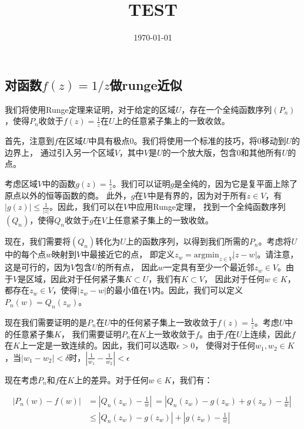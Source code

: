 \documentclass[12pt, a4paper, oneside]{article}
\title{TEST}
\date{\today}
\author{}
\begin{document}
\begin{spacing}{2.0}
\maketitle


\section{对函数$f(z) = 1/z$做runge近似}

我们将使用Runge定理来证明，对于给定的区域$U$，存在一个全纯函数序列$(P_n)$，使得$P_n$收敛于$f(z) = \frac{1}{z}$在$U$上的任意紧子集上的一致收敛。

首先，注意到$f$在区域$U$中具有极点$0$。我们将使用一个标准的技巧，将$0$移动到$U$的边界上，
通过引入另一个区域$V$，其中$V$是$U$的一个放大版，包含$0$和其他所有$U$的点。

考虑区域$V$中的函数$g(z) = \frac{1}{z}$。我们可以证明$g$是全纯的，因为它是复平面上除了原点以外的恒等函数的商。
此外，$g$在$V$中是有界的，因为对于所有$z \in V$，有$|g(z)| \leq \frac{1}{|z|}$。因此，我们可以在$V$中应用Runge定理，
找到一个全纯函数序列$(Q_n)$，使得$Q_n$收敛于$g$在$V$上任意紧子集上的一致收敛。

现在，我们需要将$(Q_n)$转化为$U$上的函数序列，以得到我们所需的$P_n$。考虑将$U$中的每个点$w$映射到$V$中最接近它的点，
即定义$z_w = \text{argmin}_{z \in V} |z - w|$。请注意，这是可行的，因为$V$包含$U$的所有点，
因此$w$一定具有至少一个最近邻$z_w \in V$。由于$V$是区域，因此对于任何紧子集$K \subset U$，我们有$K \subset V$，
因此对于任何$w \in K$，都存在$z_w \in V$，使得$|z_w - w|$的最小值在$V$内。因此，我们可以定义$P_n(w) = Q_n(z_w)$。

现在我们需要证明的是$P_n$在$U$中的任何紧子集上一致收敛于$f(z) = \frac{1}{z}$。考虑$U$中的任意紧子集$K$，
我们需要证明$P_n$在$K$上一致收敛于$f$。由于$f$在$U$上连续，因此$f$在$K$上一定是一致连续的。因此，我们可以选取$\epsilon > 0$，
使得对于任何$w_1, w_2 \in K$，当$|w_1 - w_2| < \delta$时，$|\frac{1}{w_1} - \frac{1}{w_2}| < \epsilon$

现在考虑$P_n$和$f$在$K$上的差异。对于任何$w \in K$，我们有：

\begin{equation}
    \begin{aligned}
        |P_n(w) - f(w)| &= |Q_n(z_w) - \frac{1}{w}|\
        = |Q_n(z_w) - g(z_w) + g(z_w) - \frac{1}{w}|\
        \\ &\leq |Q_n(z_w) - g(z_w)| + |g(z_w) - \frac{1}{w}|
    \end{aligned}
    \label{f2}
\end{equation}



\end{spacing}
\end{document}
